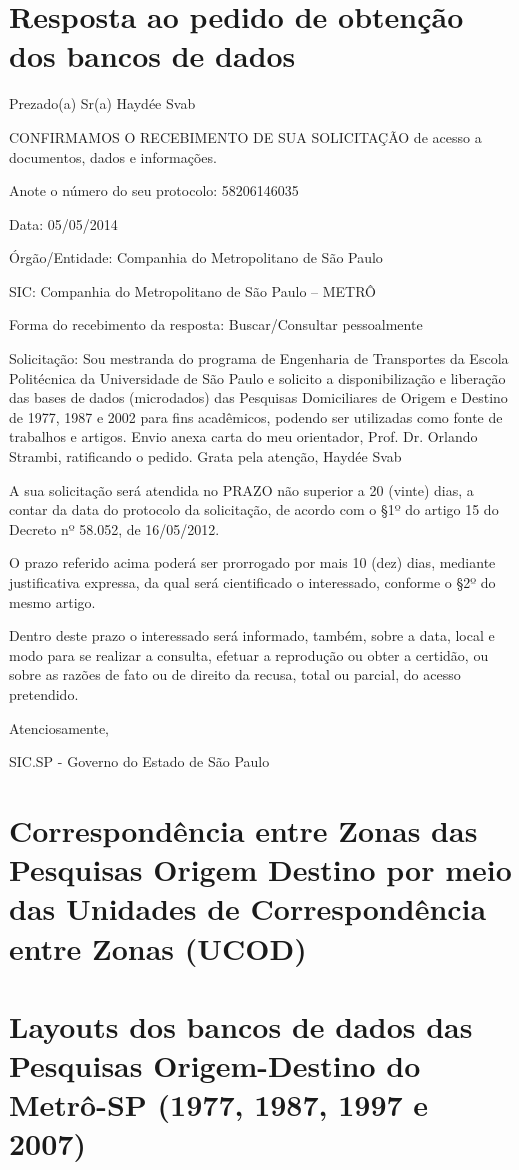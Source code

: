 \chapter{Resposta ao pedido de obtenção dos bancos de dados}\label{chap:esic}

Prezado(a) Sr(a) Haydée Svab

CONFIRMAMOS O RECEBIMENTO DE SUA SOLICITAÇÃO de acesso a documentos, dados e informações.

Anote o número do seu protocolo: 58206146035

Data: 05/05/2014

Órgão/Entidade:  Companhia do Metropolitano de São Paulo

SIC:  Companhia do Metropolitano de São Paulo – METRÔ

Forma do recebimento da resposta: Buscar/Consultar pessoalmente

Solicitação:
Sou mestranda do programa de Engenharia de Transportes da Escola Politécnica da Universidade de São Paulo e solicito a disponibilização e liberação das bases de dados (microdados) das Pesquisas Domiciliares de Origem e Destino de 1977, 1987 e 2002 para fins acadêmicos, podendo ser utilizadas como fonte de trabalhos e artigos.
Envio anexa carta do meu orientador, Prof. Dr. Orlando Strambi, ratificando o pedido.
Grata pela atenção,
Haydée Svab

A sua solicitação será atendida no PRAZO não superior a 20 (vinte) dias, a contar da data do protocolo da solicitação, de acordo com o \S1º do artigo 15 do Decreto nº 58.052, de 16/05/2012.

O prazo referido acima poderá ser prorrogado por mais 10 (dez) dias, mediante justificativa expressa, da qual será cientificado o interessado, conforme o \S2º do mesmo artigo.

Dentro deste prazo o interessado será informado, também, sobre a data, local e modo para se realizar a consulta, efetuar a reprodução ou obter a certidão, ou sobre as razões de fato ou de direito da recusa, total ou parcial, do acesso pretendido.

Atenciosamente,

SIC.SP - Governo do Estado de São Paulo 
\chapter{Correspondência entre Zonas das Pesquisas Origem Destino por meio das Unidades de Correspondência entre Zonas (UCOD)}\label{chap:anexo_ucod}



\chapter{Layouts dos bancos de dados das Pesquisas Origem-Destino do Metrô-SP (1977, 1987, 1997 e 2007)}\label{chap:anexo_layouts}




%


